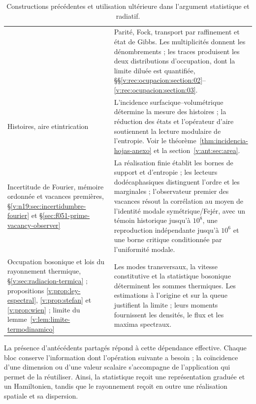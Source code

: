 \begin{table}[H]
\begin{tabularx}{\textwidth}{@{}>{\raggedright\arraybackslash}p{}>{\raggedright\arraybackslash}X@{}}
& Parité, Fock, transport par raffinement et état de Gibbs.
Les multiplicités donnent les dénombrements ; les traces produisent les deux
distributions d’occupation, dont la limite diluée est quantifiée, §§\ref{v:rec:ocupacion:section:02}--\ref{v:rec:ocupacion:section:03}. \\
Histoires, aire et\newline intrication
& L’incidence surfacique--volumétrique détermine la mesure des histoires ;
la réduction des états et l’opérateur d’aire soutiennent la lecture
modulaire de l’entropie. Voir le théorème~\ref{thm:incidencia-hojas-anexo}
et la section~\ref{v:ant:sec:area}. \\
Incertitude de Fourier, mémoire ordonnée et vacances premières,
§\ref{v:n19:sec:incertidumbre-fourier} et
§\ref{sec:f051-prime-vacancy-observer}
& La réalisation finie établit les bornes de support et d’entropie ; les
lecteurs dodécaphasiques distinguent l’ordre et les marginales ; l’observateur premier
des vacances résout la corrélation au moyen de l’identité modale
symétrique/Fejér, avec un témoin historique jusqu’à \(10^8\), une reproduction
indépendante jusqu’à \(10^6\) et une borne critique conditionnée par
l’uniformité modale. \\
Occupation bosonique et lois du rayonnement thermique,
§\ref{v:sec:radiacion-termica} ; propositions
\ref{v:prop:ley-espectral}, \ref{v:prop:stefan} et \ref{v:prop:wien} ;
limite du lemme~\ref{v:lem:limite-termodinamico}
& Les modes transversaux, la vitesse constitutive et la statistique
bosonique déterminent les sommes thermiques. Les estimations à l’origine et sur la queue
justifient la limite ; leurs moments fournissent les densités, le flux et les
maxima spectraux. \\
\bottomrule
\end{tabularx}
\caption{Constructions précédentes et utilisation ultérieure dans l’argument
statistique et radiatif.}
\label{v:tab:mapa-demostrativo}
\end{table}

La présence d’antécédents partagés répond à cette dépendance effective.
Chaque bloc conserve l’information dont l’opération suivante a besoin ;
la coïncidence d’une dimension ou d’une valeur scalaire s’accompagne de l’application
qui permet de la réutiliser. Ainsi, la statistique reçoit une représentation
graduée et un Hamiltonien, tandis que le rayonnement reçoit en outre une
réalisation spatiale et sa dispersion.
